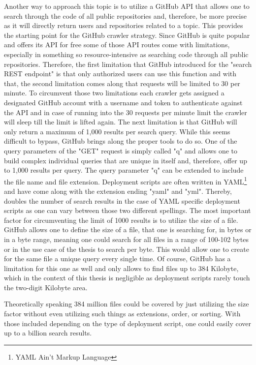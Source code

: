 Another way to approach this topic is to utilize a GitHub API that allows one to search through the code of all public repositories and, therefore, be more precise as it will directly return users and repositories related to a topic. This provides the starting point for the GitHub crawler strategy. Since GitHub is quite popular and offers its API for free some of those API routes come with limitations, especially in something so resource-intensive as searching code through all public repositories.
Therefore, the first limitation that GitHub introduced for the "search REST endpoint" is that only authorized users can use this function and with that, the second limitation comes along that requests will be limited to 30 per minute. To circumvent those two limitations each crawler gets assigned a designated GitHub account with a username and token to authenticate against the API and in case of running into the 30 requests per minute limit the crawler will sleep till the limit is lifted again.
The next limitation is that GitHub will only return a maximum of 1,000 results per search query. While this seems difficult to bypass, GitHub brings along the proper tools to do so. One of the query parameters of the "GET" request is simply called "q" and allows one to build complex individual queries that are unique in itself and, therefore, offer up to 1,000 results per query. The query parameter "q" can be extended to include the file name and file extension. Deployment scripts are often written in YAML\footnote{YAML Ain't Markup Language} and have come along with the extension ending "yaml" and "yml". Thereby, doubles the number of search results in the case of YAML specific deployment scripts as one can vary between those two different spellings. The most important factor for circumventing the limit of 1000 results is to utilize the size of a file. GitHub allows one to define the size of a file, that one is searching for, in bytes or in a byte range, meaning one could search for all files in a range of 100-102 bytes or in the use case of the thesis to search per byte. This would allow one to create for the same file a unique query every single time.
Of course, GitHub has a limitation for this one as well and only allows to find files up to 384 Kilobyte, which in the context of this thesis is negligible as deployment scripts rarely touch the two-digit Kilobyte area.

Theoretically speaking 384 million files could be covered by just utilizing the size factor without even utilizing such things as extensions, order, or sorting. With those included depending on the type of deployment script, one could easily cover up to a billion search results.

